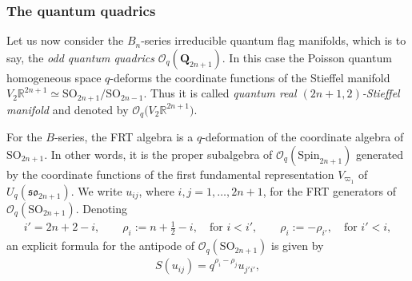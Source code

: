 \documentclass[10pt,a4paper]{amsart}
\numberwithin{equation}{section}
\begin{document}
\subsubsection{The quantum quadrics}

Let us now consider the $B_n$-series irreducible quantum flag manifolds, which is to say, the \emph{odd quantum quadrics} $\mathcal{O}_q(\mathbf{Q}_{2n+1})$. In this case the Poisson quantum homogeneous space $q$-deforms the coordinate functions of the Stieffel manifold $V_2\mathbb{R}^{2n+1} \simeq \mathrm{SO}_{2n+1}/\mathrm{SO}_{2n-1}$. Thus it is called \emph{quantum real $(2n+1,2)$-Stieffel manifold} and denoted by $\mathcal{O}_q\big(V_2\mathbb{R}^{2n+1}\big)$.

For the $B$-series, the FRT algebra is a $q$-deformation of the coordinate algebra of $\mathrm{SO}_{2n+1}$. In other words, it is the proper subalgebra of $\mathcal{O}_q(\mathrm{Spin}_{2n+1})$ generated by the coordinate functions of the first fundamental representation $V_{\varpi_1}$ of $U_q(\mathfrak{so}_{2n+1})$. We write $u_{ij}$, where $i,j = 1, \dots, 2n+1$, for the FRT generators of $\mathcal{O}_q(\mathrm{SO}_{2n+1})$. Denoting
\begin{gather*}
i' = 2n+2-i, \qquad \rho_i := n + \frac{1}{2} -i, \quad \textrm{for } i < i', \qquad \rho_{i} := -\rho_{i'}, \quad \textrm{for } i' < i,
\end{gather*}
an explicit formula for the antipode of $\mathcal{O}_q(\mathrm{SO}_{2n+1})$ is given by
\begin{gather*}
S(u_{ij}) = q^{\rho_i - \rho_j} u_{j'i'},
\end{gather*}
\end{document}
